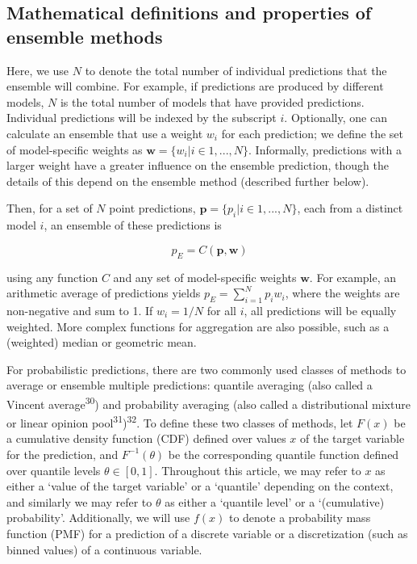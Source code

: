 \documentclass[
  letterpaper,
  DIV=11,
  numbers=noendperiod]{scrartcl}
\begin{document}
\subsection{Mathematical definitions and properties of ensemble
methods}\label{mathematical-definitions-and-properties-of-ensemble-methods}

Here, we use \(N\) to denote the total number of individual predictions
that the ensemble will combine. For example, if predictions are produced
by different models, \(N\) is the total number of models that have
provided predictions. Individual predictions will be indexed by the
subscript \(i\). Optionally, one can calculate an ensemble that use a
weight \(w_i\) for each prediction; we define the set of model-specific
weights as \(\pmb{w} = \{w_i | i \in 1, ..., N\}\). Informally,
predictions with a larger weight have a greater influence on the
ensemble prediction, though the details of this depend on the ensemble
method (described further below).

Then, for a set of \(N\) point predictions,
\(\pmb{p} = \{p_i|i \in 1, ..., N\}\), each from a distinct model \(i\),
an ensemble of these predictions is

\[
p_E = C(\pmb{p}, \pmb{w}) 
\]

using any function \(C\) and any set of model-specific weights
\(\pmb{w}\). For example, an arithmetic average of predictions yields
\(p_E = \sum_{i=1}^Np_iw_i\), where the weights are non-negative and sum
to 1. If \(w_i = 1/N\) for all \(i\), all predictions will be equally
weighted. More complex functions for aggregation are also possible, such
as a (weighted) median or geometric mean.

For probabilistic predictions, there are two commonly used classes of
methods to average or ensemble multiple predictions: quantile averaging
(also called a Vincent average\textsuperscript{30}) and probability
averaging (also called a distributional mixture or linear opinion
pool\textsuperscript{31})\textsuperscript{32}. To define these two
classes of methods, let \(F(x)\) be a cumulative density function (CDF)
defined over values \(x\) of the target variable for the prediction, and
\(F^{-1}(\theta)\) be the corresponding quantile function defined over
quantile levels \(\theta \in [0, 1]\). Throughout this article, we may
refer to \(x\) as either a `value of the target variable' or a
`quantile' depending on the context, and similarly we may refer to
\(\theta\) as either a `quantile level' or a `(cumulative) probability'.
Additionally, we will use \(f(x)\) to denote a probability mass function
(PMF) for a prediction of a discrete variable or a discretization (such
as binned values) of a continuous variable.
\end{document}
